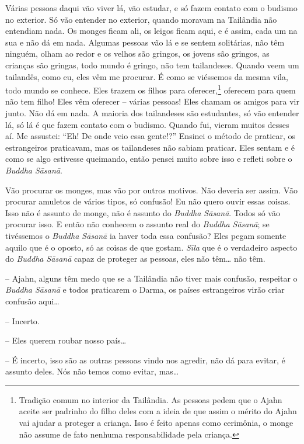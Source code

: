 Várias pessoas daqui vão viver lá, vão estudar, e só fazem contato
com o budismo no exterior. Só vão entender no exterior, quando moravam
na Tailândia não entendiam nada. Os monges ficam ali, os leigos ficam
aqui, e é assim, cada um na sua e não dá em nada. Algumas pessoas vão
lá e se sentem solitárias, não têm ninguém, olham ao redor e os velhos
são gringos, os jovens são gringos, as crianças são gringas, todo mundo
é gringo, não tem tailandeses. Quando veem um tailandês, como eu, eles
vêm me procurar. É como se viéssemos da mesma vila, todo mundo se
conhece. Eles trazem os filhos para oferecer,\footnote{Tradição comum no
interior da Tailândia. As pessoas pedem que o Ajahn aceite ser padrinho
do filho deles com a ideia de que assim o mérito do Ajahn vai ajudar a
proteger a criança. Isso é feito apenas como cerimônia, o monge não
assume de fato nenhuma responsabilidade pela criança.} oferecem para
quem não tem filho! Eles vêm oferecer – várias pessoas! Eles chamam os
amigos para vir junto. Não dá em nada. A maioria dos tailandeses são
estudantes, só vão entender lá, só lá é que fazem contato com o
budismo. Quando fui, vieram muitos desses aí. Me assustei: “Eh! De onde
veio essa gente!?” Ensinei o método de praticar, os estrangeiros
praticavam, mas os tailandeses não sabiam praticar. Eles sentam e é
como se algo estivesse queimando, então pensei muito sobre isso e
refleti sobre o \emph{Buddha Sāsanā}. 

Vão procurar os monges, mas vão por outros motivos. Não deveria ser
assim. Vão procurar amuletos de vários tipos, só confusão! Eu não quero
ouvir essas coisas. Isso não é assunto de monge, não é assunto do
\emph{Buddha Sāsanā}. Todos só vão procurar isso. E então não
conhecem o assunto real do \emph{Buddha Sāsanā}; se tivéssemos o
\emph{Buddha Sāsanā} ia haver toda essa confusão? Eles pegam
somente aquilo que é o oposto, só as coisas de que gostam.
\emph{Sīla} que é o verdadeiro aspecto do \emph{Buddha Sāsanā}
capaz de proteger as pessoas, eles não têm\ldots{} não têm. 

-- Ajahn, alguns têm medo que se a Tailândia não tiver mais
confusão, respeitar o \emph{Buddha Sāsanā} e todos praticarem o
Darma, os países estrangeiros virão criar confusão aqui\ldots{}

-- Incerto.

-- Eles querem roubar nosso país\ldots{}

-- É incerto, isso são as outras pessoas vindo nos agredir, não dá
para evitar, é assunto deles. Nós não temos como evitar, mas\ldots{}

